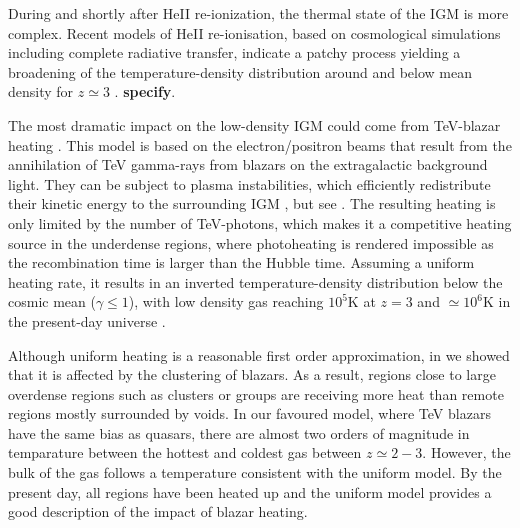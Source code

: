 \documentclass[numberedappendix]{emulateapj}
\newcommand\ALc[1]{{\color{red} \bf #1}} %
\begin{document}
During  and shortly after HeII re-ionization, the thermal state of the IGM is more complex.  Recent models of HeII re-ionisation, based on cosmological simulations including complete radiative transfer, indicate a patchy process yielding a broadening of the temperature-density distribution around and below mean density for $z\simeq 3$ \citep{2009ApJ...694..842M,2012MNRAS.423....7M,2013MNRAS.435.3169C}. \ALc{specify}.

 
The most dramatic impact on the low-density IGM could come from TeV-blazar heating \citep{2012ApJ...752...23C,2012MNRAS.423..149P,2015ApJ...811...19L}. This model is based on the electron/positron beams that result from the annihilation of TeV gamma-rays from blazars on the extragalactic background light. They can be subject to plasma instabilities, which efficiently redistribute their kinetic energy to the surrounding IGM \citep{2012ApJ...752...22B,2013ApJ...777...49S,2012ApJ...758..102S,2014ApJ...797..110C,2016ApJ...833..118C},  but see \citet{2013ApJ...770...54M,2014ApJ...787...49S}.  The resulting heating is only limited by the number of TeV-photons, which makes it a competitive heating source in the underdense regions, where photoheating is rendered impossible as the recombination time is larger than the Hubble time.  Assuming a uniform heating rate, it results in an inverted temperature-density distribution below the cosmic mean ($\gamma \leq 1$), with low density gas reaching  $10^5$K at $z=3$ and $\simeq 10^6$K in the present-day universe \citep{2012MNRAS.423..149P}.  







Although uniform heating is a reasonable first order approximation, in \citet[hereafter Paper~I]{2015ApJ...811...19L} we showed that it is affected by the clustering of blazars. As a result, regions close to large overdense regions such as clusters or groups are receiving more heat than remote regions mostly surrounded by voids.  In our favoured model, where TeV blazars have the same bias as quasars, there are almost two orders of magnitude in temparature between the hottest and coldest gas between $z\simeq 2-3$. However, the bulk of the gas follows a temperature consistent with the uniform model. By the present day, all regions have been heated up and the uniform model provides a good description of the impact of blazar heating.
\end{document}
